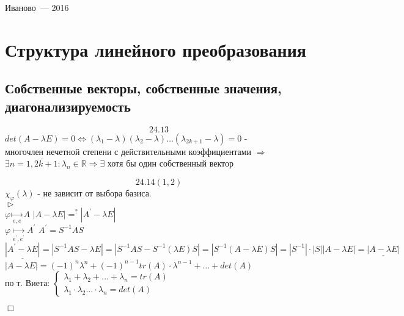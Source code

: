 \documentclass[a4paper,12pt]{report}
\begin{document}
%
\vspace{0pt plus4fill} %
\begin{center}%
	{Иваново~--- 2016}
\end{center}%
	\newpage
	
	\tableofcontents %
	\thispagestyle{empty}
	\newpage
	\begin{abstract} %
		Это моё второе задание по линейной алгебре. Летом, когда делать было совсем нечего - решил его затехать. Все равно (рано или поздно... лучше раньше)  пришлось бы нарабатывать опыт в \LaTeX. Не знаю, хорошо ли получилось - первокурсники, думаю, оценят. Если кому-нибудь будет интересно, сколько это заняло времени, или кто-то захочет исправить опечатки - пишите письма (мелким почерком) на daniek9898@gmail.com. Желаю успехов в изучении линейной алгебры!
	\end{abstract} %
	\newpage
	\section{Структура линейного преобразования}
	\subsection{Собственные векторы, собственные значения, диагонализируемость}
$$24.13$$
	$det(A - \lambda E)=0	\Longleftrightarrow (\lambda_1 - \lambda)(\lambda_2 - \lambda) \dots (\lambda_{2k+1} - \lambda) = 0$ - 
	\\ многочлен нечетной степени с действительными коэффициентами $\Rightarrow$
	\\$\exists n = \overline{1,{2k+1}} : \lambda_n \in \mathds{R} \Rightarrow \exists$ 
	хотя бы один собственный вектор

$$24.14(1,2)$$
$\chi_\varphi(\lambda)$ - не зависит от выбора базиса.
\\$\vartriangleright$
\\$\varphi \underset{e, e}\longmapsto A$ \qquad $|A - \lambda E| =^{?} |A^{'} - \lambda E|$
\\$ \varphi \underset{e^{'}, e^{'}}\longmapsto A^{'}$  \qquad $A^{'} = S^{-1} A S$
\\ $\underline{|A^{'} - \lambda E|} = |S^{-1} A S - \lambda E| = |S^{-1} A S - S^{-1} (\lambda E) S| = |S^{-1} (A - \lambda E) S| = 
|S^{-1}|\cdot |S| |A - \lambda E| = \underline{|A - \lambda E|} $
\\ $|A - \lambda E| = (-1)^{n} \lambda ^{n} + (-1)^{n-1}\textit{tr}(A) \cdot \lambda^{n-1} + \dots + det(A) $
\\ по т. Виета: $\left \{ 
\begin{gathered} 
\lambda_1 + \lambda_2 + \dots + \lambda_n = tr(A)\\
\lambda_1 \cdot \lambda_2 \dots \cdot \lambda_n = det(A)
\end{gathered}
\right.
$
\begin{flushright}
$\Box$
\end{flushright}
\end{document}
